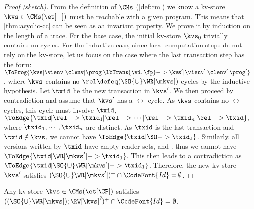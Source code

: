 \begin{proof}[Proof (sketch)]
From the definition of \( \CMs \) (\cref{def:cm})
we know a kv-store \( \kvs \in \CMs(\et[\top]) \) must be reachable with a given program.
This means that \cref{thm:acyclic-cc} can be seen as an invariant property.
We prove it by induction on the length of a trace.
For the base case, the initial kv-store \( \kvs_0 \) trivially contains no cycles.
For the inductive case, since local computation steps do not rely on the kv-store,
let us focus on the case where the last transaction step has the form:
\( \ToProg{\kvs | \vienv | \clenv | \prog | \lbTrans{\vi,\fp} -> \kvs' | \vienv' | \clenv' | \prog' } \),
where \( \kvs \) contains no \(\rel \defeq (\SO {\cup} \WR[\mkvs]) \) cycles by the inductive hypothesis.
Let \( \txid \) be the new transaction in \( \kvs' \).
We then proceed by contradiction and assume that \( \kvs' \) has a $\rel$ cycle.
As $\kvs$ contains no $\rel$ cycles, this cycle must involve  \( \txid \), \ie
\(
\ToEdge{\txid | \rel -> \txid_1 | \rel -> \cdots | \rel -> \txid_n | \rel -> \txid}, 
\)
where  \( \txid_1, \cdots,  \txid_n \) are distinct.
As \( \txid \) is the last transaction and \( \txid \notin \kvs\),
we cannot have \( \ToEdge{\txid | \SO -> \txid_1} \).
Similarly, all versions written by \( \txid \) have empty reader sets, and .
thus we cannot have \( \ToEdge{\txid | \WR[\mkvs'] -> \txid_1} \).
This then leads to a contradiction as \( \ToEdge{\txid | {\SO {\cup} \WR[\mkvs']} -> \txid_1} \).
Therefore, the new kv-store \( \kvs' \) satisfies \( (\SO {\cup} \WR[\mkvs'])^{+} \cap \CodeFont{Id} = \emptyset \).
\end{proof}
\begin{theorem}
\label{thm:acyclic-cp}
Any kv-store \( \kvs \in \CMs(\et[\CP]) \) satisfies \( ((\SO {\cup} \WR[\mkvs]) ; \RW[\kvs]^? )^{+}  \cap \CodeFont{Id} = \emptyset \).
\end{theorem}
